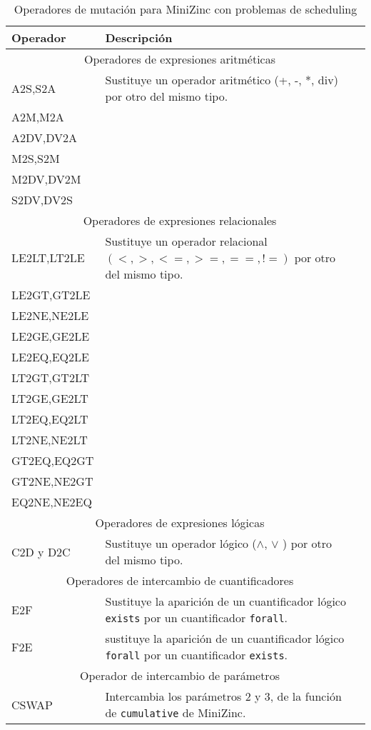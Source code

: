\begin{table*}[htb!]
    \caption{Operadores de mutación para MiniZinc con problemas de scheduling}
    \label{tab:Op-MiniZinc}
    \centering
    \small
    \begin{tabular}{l p{}r}
    \toprule
      Operador & \hspace{3cm} Descripción \\
     \midrule
     \multicolumn{2}{c}{Operadores de expresiones aritméticas} \\
     \midrule
     A2S,S2A & Sustituye un operador aritmético (+, -, *, div) por otro del mismo tipo.\\
     A2M,M2A\\
     A2DV,DV2A\\
     M2S,S2M\\
     M2DV,DV2M\\
     S2DV,DV2S\\
     \midrule
     \multicolumn{2}{c}{Operadores de expresiones relacionales} \\
     \midrule
     LE2LT,LT2LE & Sustituye un operador relacional $(<, >, <=, >=, ==, !=)$ por otro del mismo tipo.\\
     LE2GT,GT2LE\\
     LE2NE,NE2LE \\
     LE2GE,GE2LE \\
     LE2EQ,EQ2LE\\
     LT2GT,GT2LT\\
     LT2GE,GE2LT\\
     LT2EQ,EQ2LT\\
     LT2NE,NE2LT\\
     GT2EQ,EQ2GT\\
     GT2NE,NE2GT\\
     EQ2NE,NE2EQ\\

     \midrule
     \multicolumn{2}{c}{Operadores de expresiones lógicas} \\
     \midrule
     C2D y  D2C & Sustituye un operador lógico ($\wedge$, $\vee$ ) por otro del mismo tipo.\\
     \midrule
     \multicolumn{2}{c}{Operadores de intercambio de cuantificadores} \\
      \midrule
      E2F & Sustituye la aparición de un cuantificador lógico \texttt{exists}  por un cuantificador \texttt{forall}.\\
      F2E & sustituye la aparición de un cuantificador lógico \texttt{forall} por un cuantificador  \texttt{exists}.\\
     \midrule
      \multicolumn{2}{c}{Operador de intercambio de parámetros} \\
     \midrule
     CSWAP & Intercambia los parámetros 2 y 3, de la función de \texttt{cumulative} de MiniZinc. \\
    \bottomrule
    \end{tabular}
    \end{table*}


